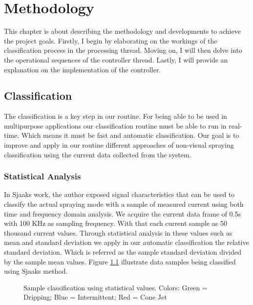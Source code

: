 \chapter{Methodology}
\label{chap:Methodology}

This chapter is about describing the methodology and developments to achieve the project goals. 
Firstly, I begin by elaborating on the workings of the classification process in the processing thread. Moving on, I will then delve into the operational sequences of the controller thread. Lastly, I will provide an explanation on the implementation of the controller.


\section{Classification}
\label{sec:section_classification}

The classification is a key step in our routine. For being able to be used in multipurpose applications our classification routine must be able to run in real-time. Which means it must be fast and automatic classification.
Our goal is to improve and apply in our routine different approaches of non-visual spraying classification using the current data collected from the system.

\subsection{Statistical Analysis}
In Sjaaks\cite{Sjaaks} work, the author exposed signal characteristics that can be used to classify the actual spraying mode with a sample of measured current using both time and frequency domain analysis.
We acquire the current data frame of 0.5s with 100 KHz as sampling frequency. With that each current sample as 50 thousand current values. Through statistical analysis in these values such as mean and standard deviation we apply in our automatic classification the relative standard deviation. Which is referred as the sample standard deviation divided by the sample mean values. 
Figure \ref{fig:sjaaks_statistical_class} illustrate data samples being classified using Sjaaks method.

\begin{figure}[H]
    \centering
    \caption{Sample classification using statistical values. Colors: Green = Dripping; Blue = Intermittent; Red = Cone Jet}
    \label{fig:sjaaks_statistical_class}
\end{figure}

